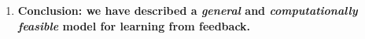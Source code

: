 \begin{enumerate}[start=5]
\item \textbf{Conclusion: we have described a \emph{general} and \emph{computationally feasible} model for learning from feedback.}
\end{enumerate}
